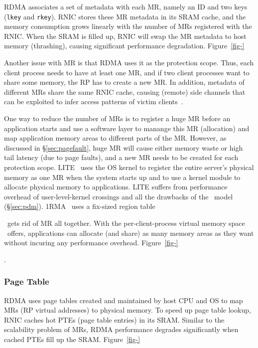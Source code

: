 RDMA associates a set of metadata with each MR, namely an ID and two keys (\texttt{lkey} and \texttt{rkey}).
RNIC stores these MR metadata in its SRAM cache, and the memory consumption grows linearly with the number of MRs registered with the RNIC. 
When the SRAM is filled up, RNIC will swap the MR metadata to host memory (thrashing), causing significant performance degradation.
Figure~\ref{fig-} 

Another issue with MR is that RDMA uses it as the protection scope.
Thus, each client process needs to have at least one MR,
and if two client processes want to share some memory, the RP has to create a new MR.
In addition, metadata of different MRs share the same RNIC cache,
causing (remote) side channels that can be exploited to infer access patterns of victim clients~\cite{Tsai19-Security}.

One way to reduce the number of MRs is to register a huge MR before an application starts and use a software layer to 
manange this MR (allocation) and map application memory areas to different parts of the MR.
However, as discussed in \S\ref{sec:pagefault}, huge MR will cause either memory waste or high tail latency (due to page faults),
and a new MR needs to be created for each protection scope.
LITE~\cite{Tsai17-SOSP} uses the OS kernel to register the entire server's physical memory as one MR when the system starts up
and to use a kernel module to allocate physical memory to applications.
LITE suffers from performance overhead of user-level-kernel crossings and all the drawbacks of the \pdm\ model (\S\ref{sec:pdm}).
1RMA~\cite{1RMA} uses a fix-sized region table

\sys\ gets rid of MR all together. 
With the per-client-process virtual memory space \sys\ offers, applications can allocate (and share) 
as many memory areas as they want without incuring any performance overhead.
Figure~\ref{fig-} 

\textit{}.

\subsubsection{Page Table}
\label{sec:pte}

RDMA uses page tables created and maintained by host CPU and OS to map MRs (RP virtual addresses) to physical memory.
To speed up page table lookup, RNIC caches hot PTEs (page table entries) in its SRAM.
Similar to the scalability problem of MRs, RDMA performance degrades significantly when cached PTEs fill up the SRAM.
Figure~\ref{fig-} 

